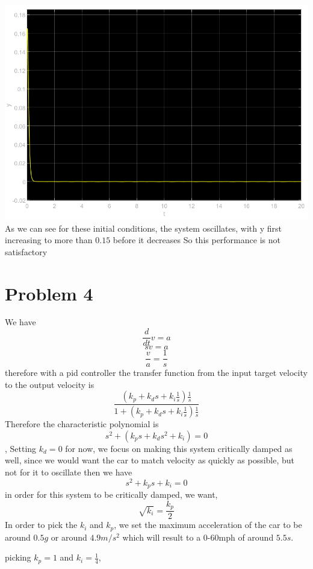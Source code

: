 \documentclass[12pt]{article}
\begin{document}
\\\includegraphics[scale=0.4]{Problem3Fig3.png}\\
As we can see for these initial conditions, the system oscillates, with y first increasing to more than $0.15$ before it decreases
So this performance is not satisfactory
\section*{Problem 4}
We have
$$\frac{d}{dt}v=a$$
$$sv=a$$
$$\frac{v}{a}=\frac{1}{s}$$
therefore with a pid controller the transfer function from the input target velocity to the output velocity is 
$$\frac{(k_p+k_ds+k_i\frac{1}{s})\frac{1}{s}}{1+(k_p+k_ds+k_i\frac{1}{s})\frac{1}{s}}$$
Therefore the characteristic polynomial is
$$s^2+(k_ps+k_ds^2+k_i)=0$$, Setting $k_d=0$ for now, we focus on making this system critically damped as well, since we would want
the car to match velocity as quickly as possible, but not for it to oscillate
then we have
$$s^2+k_ps+k_i=0$$
in order for this system to be critically damped, we want,
$$\sqrt{k_i}=\frac{k_p}{2}$$
In order to pick the $k_i$ and $k_p$, we set the maximum acceleration of the car to be around $0.5g$ or around $4.9m/s^2$ which will result to a 0-60mph
of around $5.5s$.


picking $k_p=1$ and $k_i=\frac{1}{4}$, 
\end{document}
